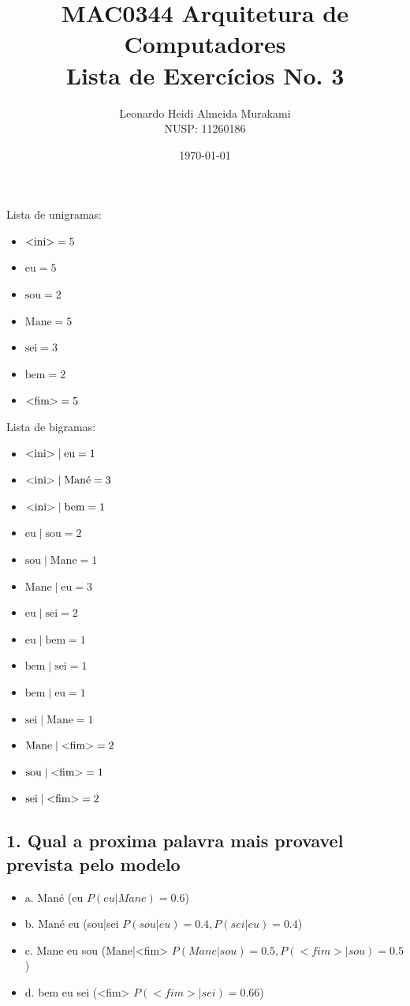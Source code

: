 \documentclass{article}
\title{MAC0344 Arquitetura de Computadores \\ Lista de Exercícios No. 3}
\author{Leonardo Heidi Almeida Murakami \\ NUSP: 11260186}
\date{\today}
\begin{document}
\maketitle
Lista de unigramas:
\begin{itemize}
    \item $\text{\textless ini\textgreater} = 5$
    \item $\text{eu} = 5$
    \item $\text{sou} = 2$
    \item $\text{Mane} = 5$
    \item $\text{sei} = 3$
    \item $\text{bem} = 2$
    \item $\text{\textless fim\textgreater} = 5$
\end{itemize}
Lista de bigramas:
\begin{itemize}
    \item $\text{\textless ini\textgreater}\mid \text{eu} = 1$
    \item $\text{\textless ini\textgreater}\mid \text{Mané} = 3$
    \item $\text{\textless ini\textgreater}\mid \text{bem} = 1$
    \item $\text{eu}\mid \text{sou} = 2$
    \item $\text{sou} \mid \text{Mane} = 1$
    \item $\text{Mane} \mid \text{eu} = 3$
    \item $\text{eu} \mid \text{sei} = 2$
    \item $\text{eu} \mid \text{bem} = 1$
    \item $\text{bem} \mid \text{sei} = 1$
    \item $\text{bem} \mid \text{eu} = 1$
    \item $\text{sei} \mid \text{Mane} = 1$
    \item $\text{Mane} \mid \text{\textless fim\textgreater} = 2$
    \item $\text{sou}\mid \text{\textless fim\textgreater} = 1$
    \item $\text{sei}\mid \text{\textless fim\textgreater} = 2$
\end{itemize}

\subsection*{1. Qual a proxima palavra mais provavel prevista pelo modelo}
\begin{itemize}
    \item a. Mané (eu $P(eu|Mane) = 0.6$)
    \item b. Mané eu (sou|sei $P(sou|eu) = 0.4, P(sei|eu) = 0.4$)
    \item c. Mane eu sou (Mane|<fim> $P(Mane|sou) = 0.5, P(<fim>|sou) = 0.5$)
    \item d. bem eu sei (<fim> $P(<fim>|sei) = 0.66$) 
\end{itemize}
\end{document}
